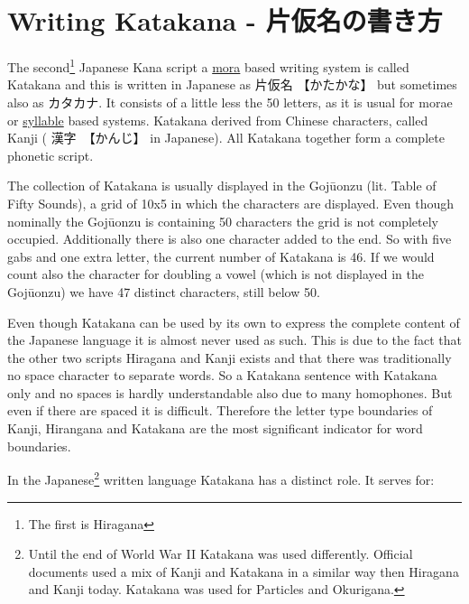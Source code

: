 \chapter{Writing Katakana - 片仮名の書き方}

The second\footnote{The first is Hiragana} Japanese Kana script a
\hyperref[sec:Mora]{mora}  based writing system is called Katakana and this is
written in Japanese as {片仮名} {【かたかな】} but sometimes also as
{カタカナ}.  It consists of a little less the 50 letters, as it is usual for
morae or \hyperref[sec:Syllable]{syllable} based systems. Katakana derived from
Chinese characters, called Kanji ( {漢字}　{【かんじ】} in Japanese). All
Katakana together form a complete phonetic script.

The collection of Katakana is usually displayed in the Gojūonzu (lit. Table of Fifty
Sounds), a grid of 10x5 in which the characters are displayed. Even though
nominally the Gojūonzu is containing 50 characters the grid is not completely occupied.
Additionally there is also one character added to the end. So with five gabs and
one extra letter, the current number of Katakana is 46. If we would count also
the character for doubling a vowel (which is not displayed in the Gojūonzu) we
have 47 distinct characters, still below 50. 



Even though Katakana can be used by its own to express the complete content of
the Japanese language it is almost never used as such. This is due to the fact
that the other two scripts Hiragana and Kanji exists and that there was
traditionally no space character to separate words. So a Katakana sentence with
Katakana only and no spaces is hardly understandable also due to many
homophones.  But even if there are spaced it is difficult. Therefore the letter
type boundaries of Kanji, Hirangana and Katakana are the most significant
indicator for word boundaries.

In the Japanese\footnote{Until the end of World War II Katakana was used
differently. Official documents used a mix of Kanji and Katakana in a similar
way then Hiragana and Kanji today. Katakana was used for Particles and
Okurigana.} written language Katakana has a distinct role. It serves for:

\bigskip

